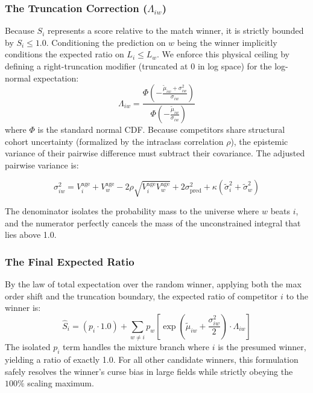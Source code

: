 \documentclass[12pt]{article}
\begin{document}
	\subsubsection*{The Truncation Correction ($\Lambda_{iw}$)}
	Because $S_i$ represents a score relative to the match winner, it is strictly bounded by $S_i \le 1.0$. Conditioning the prediction on $w$ being the winner implicitly conditions the expected ratio on $L_i \le L_w$. We enforce this physical ceiling by defining a right-truncation modifier (truncated at $0$ in log space) for the log-normal expectation:
	\begin{equation}
		\Lambda_{iw} = \frac{\Phi\!\left(-\frac{\tilde{\mu}_{iw} + \sigma_{iw}^2}{\sigma_{iw}}\right)}{\Phi\!\left(-\frac{\tilde{\mu}_{iw}}{\sigma_{iw}}\right)}
	\end{equation}
	where $\Phi$ is the standard normal CDF. Because competitors share structural cohort uncertainty (formalized by the intraclass correlation $\rho$), the epistemic variance of their pairwise difference must subtract their covariance. The adjusted pairwise variance is:

	\begin{equation}
		\sigma_{iw}^2 = V_i^{\mathrm{age}} + V_w^{\mathrm{age}} - 2\rho\sqrt{V_i^{\mathrm{age}} V_w^{\mathrm{age}}} + 2\sigma_{\mathrm{pred}}^2 + \kappa(\tilde{\sigma}_i^2 + \tilde{\sigma}_w^2)
	\end{equation}

	The denominator isolates the probability mass to the universe where $w$ beats $i$, and the numerator perfectly cancels the mass of the unconstrained integral that lies above 1.0.

	\subsubsection*{The Final Expected Ratio}
	By the law of total expectation over the random winner, applying both the max order shift and the truncation boundary, the expected ratio of competitor $i$ to the winner is:
	\begin{equation}
		\hat{S}_i = (p_i \cdot 1.0) + \sum_{w \neq i} p_w \left[ \exp\!\left(\tilde{\mu}_{iw} + \frac{\sigma_{iw}^2}{2}\right) \cdot \Lambda_{iw} \right]
	\end{equation}
	The isolated $p_i$ term handles the mixture branch where $i$ is the presumed winner, yielding a ratio of exactly 1.0. For all other candidate winners, this formulation safely resolves the winner's curse bias in large fields while strictly obeying the $100\%$ scaling maximum.
\end{document}
